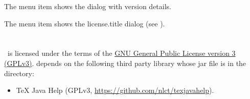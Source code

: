 
The  menu item shows the
dialog with version details.


The  menu item shows the
\InlineMsgDef
 {license.title}
dialog (see ).




\chapter{}
\label{sec:licence}

%
\appname\ is licensed under the terms of the 
\href{https://www.gnu.org/licenses/gpl-3.0.html}{GNU General
Public License version 3 (GPLv3)}.
 depends on the following third party library whose jar
file is in the  directory:
\begin{itemize}
   \item TeX Java Help 
   (GPLv3, \url{https://github.com/nlct/texjavahelp}).
\end{itemize}



\printmain
\printindex 

 

